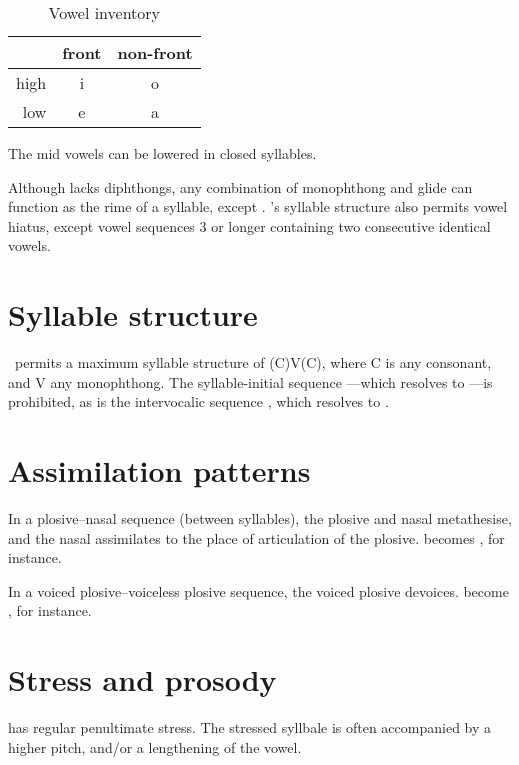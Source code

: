 \begin{table}[htbp]
  \begin{tabular}{r c c}
    \toprule
         & front & non-front \\
    \midrule
    high & i     & o         \\
    low  & e     & a         \\
    \bottomrule
  \end{tabular}
  \caption{Vowel inventory}
  \label{tab:vowels}
\end{table}

The mid vowels  can be lowered  in closed syllables.

Although \langname{} lacks diphthongs, any combination of monophthong and glide 
can function as the rime of a syllable, except . \langname's syllable structure
also permits vowel hiatus, except vowel sequences 3 or longer containing two consecutive identical vowels.

\section{Syllable structure}
\langname~permits a maximum syllable structure of (C)V(C), where C is any consonant,
and V any monophthong. The syllable-initial sequence ---which resolves to ---is prohibited, as is
the intervocalic sequence , which resolves to .

\section{Assimilation patterns}
In a plosive--nasal sequence (between syllables), the plosive and nasal metathesise, and
the nasal assimilates to the place of articulation of the plosive.  becomes
, for instance.

In a voiced plosive--voiceless plosive sequence, the voiced plosive devoices. 
become , for instance.

\section{Stress and prosody}
\langname{} has regular penultimate stress. The stressed syllbale is often accompanied
by a higher pitch, and/or a lengthening of the vowel.